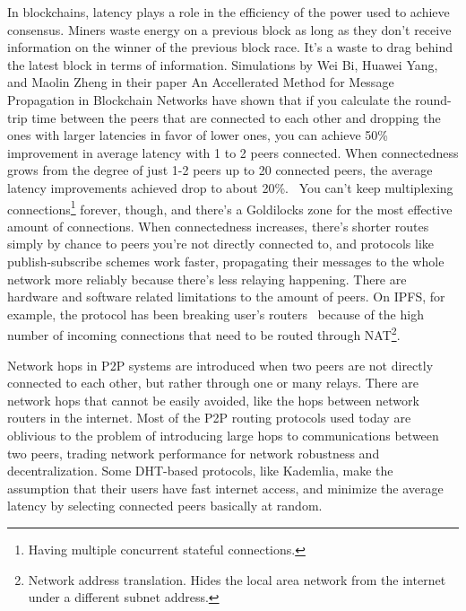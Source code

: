 In blockchains, latency plays a role in the efficiency of the power used to achieve consensus. Miners waste energy on a previous block as long as they don't receive information on the winner of the previous block race. It's a waste to drag behind the latest block in terms of information. Simulations by Wei Bi, Huawei Yang, and Maolin Zheng in their paper An Accellerated Method for Message Propagation in Blockchain Networks have shown that if you calculate the round-trip time between the peers that are connected to each other and dropping the ones with larger latencies in favor of lower ones, you can achieve 50\% improvement in average latency with 1 to 2 peers connected. When connectedness grows from the degree of just 1-2 peers up to 20 connected peers, the average latency improvements achieved drop to about 20\%.~\cite{Bi_undated-is} You can't keep multiplexing connections\footnote{Having multiple concurrent stateful connections.} forever, though, and there's a Goldilocks zone for the most effective amount of connections. When connectedness increases, there's shorter routes simply by chance to peers you're not directly connected to, and protocols like publish-subscribe schemes work faster, propagating their messages to the whole network more reliably because there's less relaying happening. There are hardware and software related limitations to the amount of peers. On IPFS, for example, the protocol has been breaking user's routers~\cite{Whyrusleeping2016-ej} because of the high number of incoming connections that need to be routed through NAT\footnote{Network address translation. Hides the local area network from the internet under a different subnet address.}.

Network hops in P2P systems are introduced when two peers are not directly connected to each other, but rather through one or many relays. There are network hops that cannot be easily avoided, like the hops between network routers in the internet. Most of the P2P routing protocols used today are oblivious to the problem of introducing large hops to communications between two peers, trading network performance for network robustness and decentralization. Some DHT-based protocols, like Kademlia, make the assumption that their users have fast internet access, and minimize the average latency by selecting connected peers basically at random.

